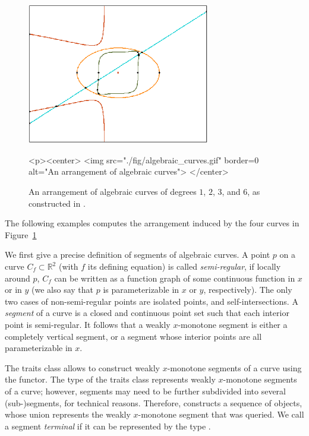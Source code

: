 \begin{figure}[t]
\begin{ccTexOnly}
  \begin{center}
  \includegraphics[width=8cm]{Arrangement_on_surface_2/fig/algebraic_curves}
  \end{center}
\end{ccTexOnly}
\begin{ccHtmlOnly}
  <p><center>
  <img src="./fig/algebraic_curves.gif" border=0 alt="An arrangement of algebraic curves">
  </center>
\end{ccHtmlOnly}
\caption{An arrangement of algebraic curves of degrees $1$, $2$, $3$, and $6$,
as constructed in .\label{arr_fig:ex_alg_curves}}
\end{figure}

The following examples computes the arrangement induced by the four curves
in Figure~\ref{arr_fig:ex_alg_curves}


We first give a precise definition of segments of algebraic curves.
A point $p$ on a curve $C_f\subset\mathbb{R}^2$ 
(with $f$ its defining equation) is called
\emph{semi-regular}, if locally around $p$, $C_f$ can be written as
a function graph of some continuous function in $x$ or in $y$
(we also say that $p$ is parameterizable in $x$ or $y$, respectively).
The only two cases of non-semi-regular points are isolated points, and
self-intersections. 
A \emph{segment} of a curve is a closed and continuous point set 
such that each interior point is semi-regular.
It follows that a weakly $x$-monotone segment is either a completely vertical
segment, or a segment whose interior points are all parameterizable in $x$.

The traits class allows to construct weakly $x$-monotone segments of a curve
using the  functor.
The  type of the traits class represents
weakly $x$-monotone segments of a curve; however,
segments may need to be further subdivided into several (sub-)segments,
for technical reasons. Therefore, 
constructs a sequence of  objects, whose union
represents the weakly $x$-monotone segment that was queried.
We call a segment \emph{terminal} if it can be represented
by the type .

